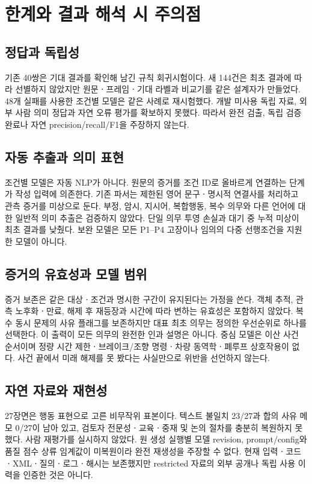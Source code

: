 \section{한계와 결과 해석 시 주의점}
\label{sec:threats}

\begin{revision}

\subsection{정답과 독립성}
기존 40쌍은 기대 결과를 확인해 남긴 규칙 회귀시험이다. 새 144건은 최초 결과에 따라 선별하지 않았지만 원문ㆍ프레임ㆍ기대 라벨과 비교기를 같은 설계자가 만들었다. 48개 실패를 사용한 조건별 모델은 같은 사례로 재시험했다. 개발 미사용 독립 자료, 외부 사람 의미 정답과 자연 오류 평가를 확보하지 못했다. 따라서 완전 검출, 독립 검증 완료나 자연 precision/recall/F1을 주장하지 않는다.

\subsection{자동 추출과 의미 표현}
조건별 모델은 자동 NLP가 아니다. 원문의 증거를 조건 ID로 올바르게 연결하는 단계가 작성 입력에 의존한다. 기존 파서는 제한된 영어 문구ㆍ명시적 연결사를 처리하고 관측 증거를 미상으로 둔다. 부정, 암시, 지시어, 복합행동, 복수 의무와 다른 언어에 대한 일반적 의미 추출은 검증하지 않았다. 단일 의무 투영 손실과 대기 중 누적 미상이 최초 결과를 낮췄다. 보완 모델은 모든 P1--P4 고장이나 임의의 다중 선행조건을 지원한 모델이 아니다.

\subsection{증거의 유효성과 모델 범위}
증거 보존은 같은 대상ㆍ조건과 명시한 구간이 유지된다는 가정을 쓴다. 객체 추적, 관측 노후화ㆍ만료, 해제 후 재등장과 시간에 따라 변하는 유효성은 포함하지 않았다. 복수 동시 문제의 사유 플래그를 보존하지만 대표 최초 의무는 정의한 우선순위로 하나를 선택한다. 이 출력이 모든 의무의 완전한 인과 설명은 아니다. 중심 모델은 이산 사건 순서이며 정량 시간 제한ㆍ브레이크/조향 명령ㆍ차량 동역학ㆍ폐루프 상호작용이 없다. 사건 끝에서 미래 해제를 못 봤다는 사실만으로 위반을 선언하지 않는다.

\subsection{자연 자료와 재현성}
27장면은 행동 표현으로 고른 비무작위 표본이다. 텍스트 불일치 23/27과 합의 사유 메모 0/27이 남아 있고, 검토자 전문성ㆍ교육ㆍ중재 및 논의 절차를 충분히 복원하지 못했다. 사람 재평가를 실시하지 않았다. 원 생성 실행별 모델 revision, prompt/config와 품질 점수 상류 임계값이 미복원이라 완전 재생성을 주장할 수 없다. 현재 입력ㆍ코드ㆍXMLㆍ질의ㆍ로그ㆍ해시는 보존했지만 restricted 자료의 외부 공개나 독립 사용 이력을 인증한 것은 아니다.


\end{revision}
